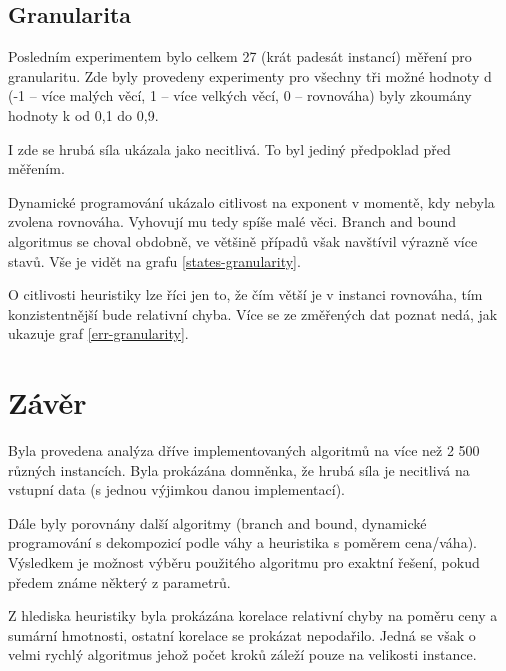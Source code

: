 \documentclass[a4paper]{article}
\begin{document}
	\subsection{Granularita}
	
		Posledním experimentem bylo celkem 27 (krát padesát instancí) měření pro granularitu. Zde byly provedeny experimenty pro všechny tři možné hodnoty d (-1 -- více malých věcí, 1 -- více velkých věcí, 0 -- rovnováha) byly zkoumány hodnoty k od 0,1 do 0,9.
		
		I zde se hrubá síla ukázala jako necitlivá. To byl jediný předpoklad před měřením.
		
		Dynamické programování ukázalo citlivost na exponent v momentě, kdy nebyla zvolena rovnováha. Vyhovují mu tedy spíše malé věci. Branch and bound algoritmus se choval obdobně, ve většině případů však navštívil výrazně více stavů. Vše je vidět na grafu \ref{states-granularity}.
		
		O citlivosti heuristiky lze říci jen to, že čím větší je v instanci rovnováha, tím konzistentnější bude relativní chyba. Více se ze změřených dat poznat nedá, jak ukazuje graf \ref{err-granularity}.
		
		
\section{Závěr}
	Byla provedena analýza dříve implementovaných algoritmů na více než 2 500 různých instancích. Byla prokázána domněnka, že hrubá síla je necitlivá na vstupní data (s jednou výjimkou danou implementací).
	
	Dále byly porovnány další algoritmy (branch and bound, dynamické programování s dekompozicí podle váhy a heuristika s poměrem cena/váha). Výsledkem je možnost výběru použitého algoritmu pro exaktní řešení, pokud předem známe některý z parametrů.
	
	Z hlediska heuristiky byla prokázána korelace relativní chyby na poměru ceny a sumární hmotnosti, ostatní korelace se prokázat nepodařilo. Jedná se však o velmi rychlý algoritmus jehož počet kroků záleží pouze na velikosti instance.
\end{document}
